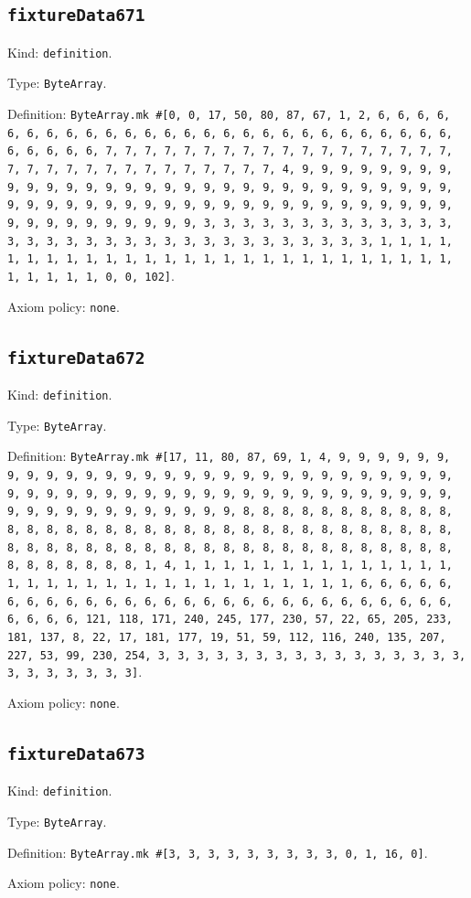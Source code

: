 \documentclass[11pt]{article}
\begin{document}
\subsection*{\texttt{fixtureData671}}
\noindent Kind: \texttt{definition}.\par
\noindent Type: \texttt{ByteArray}.\par
\noindent Definition: \texttt{ByteArray.mk \#[0, 0, 17, 50, 80, 87, 67, 1, 2, 6, 6, 6, 6, 6, 6, 6, 6, 6, 6, 6, 6, 6, 6, 6, 6, 6, 6, 6, 6, 6, 6, 6, 6, 6, 6, 6, 6, 6, 6, 6, 6, 7, 7, 7, 7, 7, 7, 7, 7, 7, 7, 7, 7, 7, 7, 7, 7, 7, 7, 7, 7, 7, 7, 7, 7, 7, 7, 7, 7, 7, 7, 7, 7, 4, 9, 9, 9, 9, 9, 9, 9, 9, 9, 9, 9, 9, 9, 9, 9, 9, 9, 9, 9, 9, 9, 9, 9, 9, 9, 9, 9, 9, 9, 9, 9, 9, 9, 9, 9, 9, 9, 9, 9, 9, 9, 9, 9, 9, 9, 9, 9, 9, 9, 9, 9, 9, 9, 9, 9, 9, 9, 9, 9, 9, 9, 9, 9, 9, 3, 3, 3, 3, 3, 3, 3, 3, 3, 3, 3, 3, 3, 3, 3, 3, 3, 3, 3, 3, 3, 3, 3, 3, 3, 3, 3, 3, 3, 3, 3, 3, 1, 1, 1, 1, 1, 1, 1, 1, 1, 1, 1, 1, 1, 1, 1, 1, 1, 1, 1, 1, 1, 1, 1, 1, 1, 1, 1, 1, 1, 1, 1, 1, 0, 0, 102]}.\par
\noindent Axiom policy: \texttt{none}.\par
\subsection*{\texttt{fixtureData672}}
\noindent Kind: \texttt{definition}.\par
\noindent Type: \texttt{ByteArray}.\par
\noindent Definition: \texttt{ByteArray.mk \#[17, 11, 80, 87, 69, 1, 4, 9, 9, 9, 9, 9, 9, 9, 9, 9, 9, 9, 9, 9, 9, 9, 9, 9, 9, 9, 9, 9, 9, 9, 9, 9, 9, 9, 9, 9, 9, 9, 9, 9, 9, 9, 9, 9, 9, 9, 9, 9, 9, 9, 9, 9, 9, 9, 9, 9, 9, 9, 9, 9, 9, 9, 9, 9, 9, 9, 9, 9, 9, 9, 9, 8, 8, 8, 8, 8, 8, 8, 8, 8, 8, 8, 8, 8, 8, 8, 8, 8, 8, 8, 8, 8, 8, 8, 8, 8, 8, 8, 8, 8, 8, 8, 8, 8, 8, 8, 8, 8, 8, 8, 8, 8, 8, 8, 8, 8, 8, 8, 8, 8, 8, 8, 8, 8, 8, 8, 8, 8, 8, 8, 8, 8, 8, 8, 8, 1, 4, 1, 1, 1, 1, 1, 1, 1, 1, 1, 1, 1, 1, 1, 1, 1, 1, 1, 1, 1, 1, 1, 1, 1, 1, 1, 1, 1, 1, 1, 1, 1, 1, 6, 6, 6, 6, 6, 6, 6, 6, 6, 6, 6, 6, 6, 6, 6, 6, 6, 6, 6, 6, 6, 6, 6, 6, 6, 6, 6, 6, 6, 6, 6, 6, 121, 118, 171, 240, 245, 177, 230, 57, 22, 65, 205, 233, 181, 137, 8, 22, 17, 181, 177, 19, 51, 59, 112, 116, 240, 135, 207, 227, 53, 99, 230, 254, 3, 3, 3, 3, 3, 3, 3, 3, 3, 3, 3, 3, 3, 3, 3, 3, 3, 3, 3, 3, 3, 3, 3]}.\par
\noindent Axiom policy: \texttt{none}.\par
\subsection*{\texttt{fixtureData673}}
\noindent Kind: \texttt{definition}.\par
\noindent Type: \texttt{ByteArray}.\par
\noindent Definition: \texttt{ByteArray.mk \#[3, 3, 3, 3, 3, 3, 3, 3, 3, 0, 1, 16, 0]}.\par
\noindent Axiom policy: \texttt{none}.\par
\end{document}
